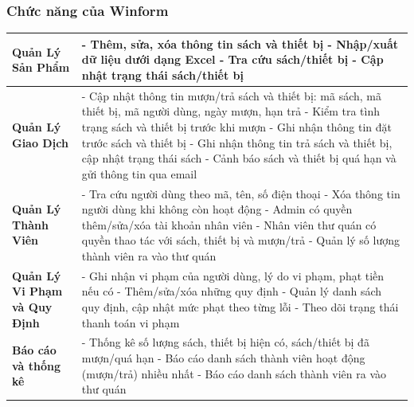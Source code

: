 \documentclass{article}
\begin{document}
\subsubsection{Chức năng của Winform}
\begin{table}[H]
\centering
\renewcommand{\arraystretch}{1.6}
\begin{tabular}{|p{4.5cm}|p{10cm}|}
\hline
\textbf{Quản Lý Sản Phẩm} & 
- Thêm, sửa, xóa thông tin sách và thiết bị \newline
- Nhập/xuất dữ liệu dưới dạng Excel \newline
- Tra cứu sách/thiết bị \newline
- Cập nhật trạng thái sách/thiết bị \\
\hline
\textbf{Quản Lý Giao Dịch} & 
- Cập nhật thông tin mượn/trả sách và thiết bị: mã sách, mã thiết bị, mã người dùng, ngày mượn, hạn trả \newline
- Kiểm tra tình trạng sách và thiết bị trước khi mượn \newline
- Ghi nhận thông tin đặt trước sách và thiết bị \newline
- Ghi nhận thông tin trả sách và thiết bị, cập nhật trạng thái sách \newline
- Cảnh báo sách và thiết bị quá hạn và gửi thông tin qua email \\
\hline
\textbf{Quản Lý Thành Viên} & 
- Tra cứu người dùng theo mã, tên, số điện thoại \newline
- Xóa thông tin người dùng khi không còn hoạt động \newline
- Admin có quyền thêm/sửa/xóa tài khoản nhân viên \newline
- Nhân viên thư quán có quyền thao tác với sách, thiết bị và mượn/trả \newline
- Quản lý số lượng thành viên ra vào thư quán \\
\hline
\textbf{Quản Lý Vi Phạm và Quy Định} & 
- Ghi nhận vi phạm của người dùng, lý do vi phạm, phạt tiền nếu có \newline
- Thêm/sửa/xóa những quy định \newline
- Quản lý danh sách quy định, cập nhật mức phạt theo từng lỗi \newline
- Theo dõi trạng thái thanh toán vi phạm \\
\hline
\textbf{Báo cáo và thống kê} & 
- Thống kê số lượng sách, thiết bị hiện có, sách/thiết bị đã mượn/quá hạn \newline
- Báo cáo danh sách thành viên hoạt động (mượn/trả) nhiều nhất \newline
- Báo cáo danh sách thành viên ra vào thư quán \\
\hline
\end{tabular}
\end{table}
\end{document}

